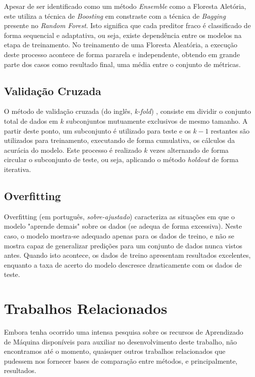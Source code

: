 \documentclass[12pt]{article}
\begin{document}
Apesar de ser identificado como um método \emph{Ensemble} como a Floresta Aletória, este utiliza a técnica de \emph{Boosting} em constraste com a técnica de \emph{Bagging} presente no \emph{Random Forest}. Isto significa que cada preditor fraco é classificado de forma sequencial e adaptativa, ou seja, existe dependência entre os modelos na etapa de treinamento. No treinamento de uma Floresta Aleatória, a execução deste processo acontece de forma pararela e independente, obtendo em grande parte dos casos como resultado final, uma média entre o conjunto de métricas.

\subsection{Validação Cruzada}

O método de validação cruzada (do inglês, \emph{k-fold}) \cite{CV}, consiste em dividir o conjunto total de dados em \(k\) subconjuntos mutuamente exclusivos de mesmo tamanho. A partir deste ponto, um subconjunto é utilizado para teste e os \(k - 1\) restantes são utilizados para treinamento, executando de forma cumulativa, os cálculos da acurácia do modelo. Este processo é realizado \(k\) vezes alternando de forma circular o subconjunto de teste, ou seja, aplicando o método \emph{holdout} de forma iterativa.

\subsection{Overfitting}

Overfitting (em português, \emph{sobre-ajustado}) \cite{Overfitting} caracteriza as situações em que o modelo "aprende demais" sobre os dados (se adequa de forma excessiva). Neste caso, o modelo mostra-se adequado apenas para os dados de treino, e não se mostra capaz de generalizar predições para um conjunto de dados nunca vistos antes. Quando isto acontece, os dados de treino apresentam resultados excelentes, enquanto a taxa de acerto do modelo descresce drasticamente com os dados de teste.

\section{Trabalhos Relacionados}

Embora tenha ocorrido uma intensa pesquisa sobre os recursos de Aprendizado de Máquina disponíveis para auxiliar no desenvolvimento deste trabalho, não encontramos até o momento, quaisquer outros trabalhos relacionados que pudessem nos fornecer bases de comparação entre métodos, e principalmente, resultados.
\end{document}
